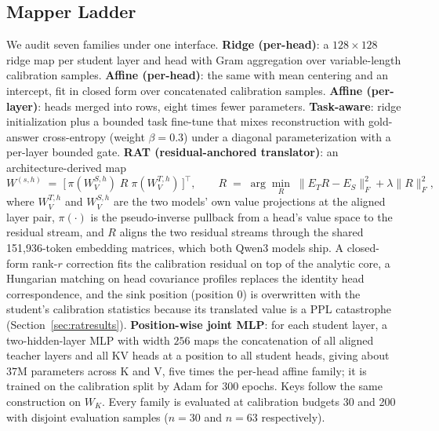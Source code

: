 \documentclass{article} %
\begin{document}
\subsection{Mapper Ladder}
We audit seven families under one interface. \textbf{Ridge (per-head)}: a
$128\times128$ ridge map per student layer and head with Gram aggregation
over variable-length calibration samples. \textbf{Affine (per-head)}: the
same with mean centering and an intercept, fit in closed form over
concatenated calibration samples. \textbf{Affine (per-layer)}: heads merged
into rows, eight times fewer parameters. \textbf{Task-aware}: ridge
initialization plus a bounded task fine-tune that mixes reconstruction with
gold-answer cross-entropy (weight $\beta{=}0.3$) under a diagonal
parameterization with a per-layer bounded gate. \textbf{RAT
(residual-anchored translator)}: an architecture-derived map
\begin{equation}
W^{(s,h)} \;=\; \bigl[\,\pi(W^{S,h}_V)\;R\;\pi(W^{T,h}_V)\,\bigr]^{\!\top},
\qquad
R \;=\; \arg\min_R \; \|E_T R - E_S\|_F^2 + \lambda \|R\|_F^2,
\end{equation}
where $W^{T,h}_V$ and $W^{S,h}_V$ are the two models' own value projections
at the aligned layer pair, $\pi(\cdot)$ is the pseudo-inverse pullback from a
head's value space to the residual stream, and $R$ aligns the two residual
streams through the shared 151{,}936-token embedding matrices, which both
Qwen3 models ship. A closed-form rank-$r$ correction fits the calibration
residual on top of the analytic core, a Hungarian matching on head covariance
profiles replaces the identity head correspondence, and the sink position
(position 0) is overwritten with the student's calibration statistics because
its translated value is a PPL catastrophe (Section~\ref{sec:ratresults}).
\textbf{Position-wise joint MLP}: for each student layer, a
two-hidden-layer MLP with width $256$ maps the concatenation of all aligned
teacher layers and all KV heads at a position to all student heads, giving
about $37$M parameters across K and V, five times the per-head affine family;
it is trained on the calibration split by Adam for $300$ epochs.
Keys follow the same construction on $W_K$. Every family is evaluated at
calibration budgets 30 and 200 with disjoint evaluation samples
($n{=}30$ and $n{=}63$ respectively).
\end{document}
